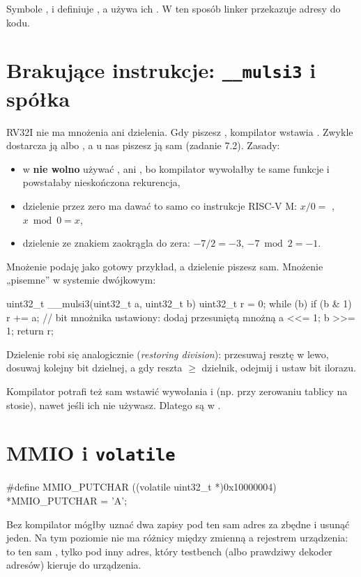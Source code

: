 Symbole ,  i  definiuje
, a używa ich . W ten sposób linker przekazuje adresy do
kodu.

\section{Brakujące instrukcje: \texttt{\_\_mulsi3} i spółka}

RV32I nie ma mnożenia ani dzielenia. Gdy piszesz , kompilator wstawia
. Zwykle dostarcza ją  albo
, a u nas piszesz ją sam (zadanie 7.2). Zasady:

\begin{itemize}
  \item w  \textbf{nie wolno} używać \code{*}, \code{/} ani
    \code{\%}, bo kompilator wywołałby te same funkcje i powstałaby nieskończona
    rekurencja,
  \item dzielenie przez zero ma dawać to samo co instrukcje RISC-V M:
    $x / 0 = $ , $x \bmod 0 = x$,
  \item dzielenie ze znakiem zaokrągla do zera: $-7/2 = -3$, $-7 \bmod 2 = -1$.
\end{itemize}

Mnożenie podaję jako gotowy przykład, a dzielenie piszesz sam. Mnożenie „pisemne” w systemie dwójkowym:
\begin{cc}
uint32_t __mulsi3(uint32_t a, uint32_t b) {
    uint32_t r = 0;
    while (b) {
        if (b & 1) r += a;     // bit mnożnika ustawiony: dodaj przesuniętą mnożną
        a <<= 1;
        b >>= 1;
    }
    return r;
}
\end{cc}
Dzielenie robi się analogicznie (\emph{restoring division}): przesuwaj resztę w
lewo, dosuwaj kolejny bit dzielnej, a gdy reszta $\geq$ dzielnik, odejmij i ustaw
bit ilorazu.

Kompilator potrafi też sam wstawić wywołania  i  (np.
przy zerowaniu tablicy na stosie), nawet jeśli ich nie używasz. Dlatego są w
.

\section{MMIO i \texttt{volatile}}

\begin{cc}
#define MMIO_PUTCHAR ((volatile uint32_t *)0x10000004)
*MMIO_PUTCHAR = 'A';
\end{cc}
Bez  kompilator mógłby uznać dwa zapisy pod ten sam adres za zbędne
i usunąć jeden. Na tym poziomie nie ma różnicy między zmienną a rejestrem
urządzenia: to ten sam , tylko pod inny adres, który testbench (albo
prawdziwy dekoder adresów) kieruje do urządzenia.

